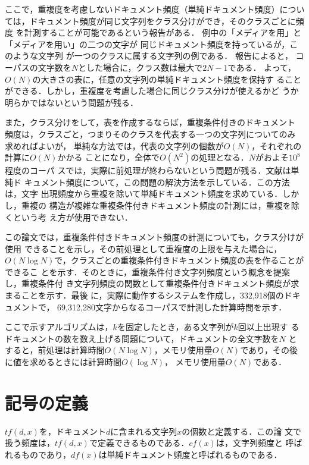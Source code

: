 ここで，重複度を考慮しないドキュメント頻度（単純ドキュメント頻度）につい
ては，ドキュメント頻度が同じ文字列をクラス分けができ，そのクラスごとに頻度
を計測することが可能であるという報告\cite{DF1}がある．
例中の「メディアを用」と「メディアを用い」の二つの文字が
同じドキュメント頻度を持っているが，このような文字列
が一つのクラスに属する文字列の例である．
報告\cite{DF1}によると，
コーパスの文字数を$N$とした場合に，クラス数は最大で$2N-1$である．
よって，$O(N)$の大きさの表に，任意の文字列の単純ドキュメント頻度を保持す
ることができる．しかし，重複度を考慮した場合に同じクラス分けが使えるかど
うか明らかではないという問題が残る．

また，クラス分けをして，表を作成するならば，重複条件付きのドキュメント
頻度は，クラスごと，つまりそのクラスを代表する一つの文字列についてのみ
求めればよいが，
単純な方法では，代表の文字列の個数が$O(N)$，それぞれの計算に$O(N)$かかる
ことになり，全体で$O(N^2)$の処理となる．$N$がおよそ$10^8$程度のコーパ
スでは，実際に前処理が終わらないという問題が残る．文献\cite{DF1}は単純ド
キュメント頻度について，この問題の解決方法を示している．この方法は，文字
出現頻度から重複を除いて単純ドキュメント頻度を求めている．しかし，重複の
構造が複雑な重複条件付きドキュメント頻度の計測には，重複を除くという考
え方が使用できない．

この論文では，重複条件付きドキュメント頻度の計測についても，クラス分けが使用
できることを示し，その前処理として重複度の上限を与えた場合に，$O(N \log
N)$で，クラスごとの重複条件付きドキュメント頻度の表を作ることができるこ
とを示す．そのときに，重複条件付き文字列頻度という概念を提案し，重複条件付
き文字列頻度の関数として重複条件付きドキュメント頻度が求まることを示す．最後
に，実際に動作するシステムを作成し，332,918個のドキュメントで，
69,312,280文字からなるコーパスで計測した計算時間を示す．

ここで示すアルゴリズムは，$k$を固定したとき，ある文字列が$k$回以上出現す
るドキュメントの数を数え上げる問題について，ドキュメントの全文字数を$N$
とすると，前処理は計算時間$O(N\log N)$，メモリ使用量$O(N)$であり，その後
に値を求めるときには計算時間$O(\log N)$， メモリ使用量$O(N)$である．


\section{記号の定義}

$tf(d,x)$を，ドキュメント$d$に含まれる文字列$x$の個数と定義する．この論
文で扱う頻度は，$tf(d,x)$で定義できるものである．$cf(x)$は，文字列頻度と
呼ばれるものであり，$df(x)$は単純ドキュメント頻度と呼ばれるものである．


